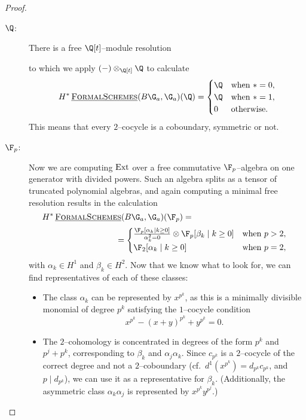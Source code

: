 \begin{proof}
\begin{description}
\item[\(\Q\):] There is a free \(\Q[t]\)--module resolution
\begin{center}
\end{center}
to which we apply \((-) \otimes_{\Q[t]} \Q\) to calculate \[H^* \InternalHom{FormalSchemes}(B\G_a, \G_a)(\Q) = \begin{cases} \Q & \text{when \(* = 0\)}, \\ \Q & \text{when \(* = 1\)}, \\ 0 & \text{otherwise}. \end{cases}\] This means that every \(2\)--cocycle is a coboundary, symmetric or not.
\item[\(\F_p\):] Now we are computing \(\operatorname{Ext}\) over a free commutative \(\F_p\)--algebra on one generator with divided powers.  Such an algebra splits as a tensor of truncated polynomial algebras, and again computing a minimal free resolution results in the calculation
\[H^* \InternalHom{FormalSchemes}(B\G_a, \G_a)(\F_p) =\hspace{12em}\]
\[\hspace{8.5em}=
\begin{cases}
\frac{\F_p[\alpha_k \mid k \ge 0]}{\alpha_k^2 = 0} \otimes \F_p[\beta_k \mid k \ge 0] & \text{when \(p > 2\)}, \\
\F_2[\alpha_k \mid k \ge 0] & \text{when \(p = 2\)},
\end{cases}\] with \(\alpha_k \in H^1\) and \(\beta_k \in H^2\).  Now that we know what to look for, we can find representatives of each of these classes:
\begin{itemize}
\item The class \(\alpha_k\) can be represented by \(x^{p^k}\), as this is a minimally divisible monomial of degree \(p^k\) satisfying the \(1\)--cocycle condition \[x^{p^k} - (x+y)^{p^k} + y^{p^k} = 0.\]
\item The \(2\)--cohomology is concentrated in degrees of the form \(p^k\) and \(p^j + p^k\), corresponding to \(\beta_k\) and \(\alpha_j \alpha_k\).  Since \(c_{p^k}\) is a \(2\)--cocycle of the correct degree and not a \(2\)--coboundary (cf.\ \(d^1(x^{p^k}) = d_{p^k} c_{p^k}\), and \(p \mid d_{p^k}\)), we can use it as a representative for \(\beta_k\).  (Additionally, the asymmetric class \(\alpha_k \alpha_j\) is represented by \(x^{p^k} y^{p^j}\).)

\end{itemize}
\end{description}
\end{proof}
